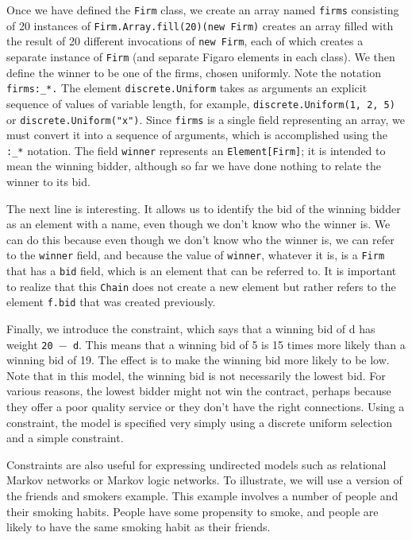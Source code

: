 Once we have defined the \texttt{Firm} class, we create an array named \texttt{firms} consisting of 20 instances of \texttt{Firm.Array.fill(20)(new Firm)} creates an array filled with the result of 20 different invocations of \texttt{new Firm}, each of which creates a separate instance of  \texttt{Firm} (and separate Figaro elements in each class). We then define the winner to be one of the firms, chosen uniformly. Note the notation \texttt{firms:\_*.} The element \texttt{discrete.Uniform} takes as arguments an explicit sequence of values of variable length, for example, \texttt{discrete.Uniform(1, 2, 5)} or \texttt{discrete.Uniform("x")}. Since \texttt{firms} is a single field representing an array, we must convert it into a sequence of arguments, which is accomplished using the \texttt{:\_*} notation. The field \texttt{winner} represents an \texttt{Element[Firm]}; it is intended to mean the winning bidder, although so far we have done nothing to relate the winner to its bid.
 
The next line is interesting. It allows us to identify the bid of the winning bidder as an element with a name, even though we don't know who the winner is. We can do this because even though we don't know who the winner is, we can refer to the \texttt{winner} field, and because the value of \texttt{winner}, whatever it is, is a \texttt{Firm} that has a \texttt{bid} field, which is an element that can be referred to. It is important to realize that this \texttt{Chain} does not create a new element but rather refers to the element \texttt{f.bid} that was created previously.

Finally, we introduce the constraint, which says that a winning bid of d has weight \texttt{20 $-$ d}. This means that a winning bid of 5 is 15 times more likely than a winning bid of 19. The effect is to make the winning bid more likely to be low. Note that in this model, the winning bid is not necessarily the lowest bid. For various reasons, the lowest bidder might not win the contract, perhaps because they offer a poor quality service or they don't have the right connections. Using a constraint, the model is specified very simply using a discrete uniform selection and a simple constraint.

Constraints are also useful for expressing undirected models such as relational Markov networks or Markov logic networks. To illustrate, we will use a version of the friends and smokers example. This example involves a number of people and their smoking habits. People have some propensity to smoke, and people are likely to have the same smoking habit as their friends.

